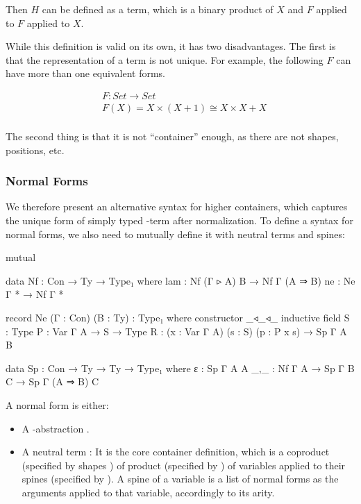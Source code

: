 Then $H$ can be defined as a term, which is a binary product of $X$ and $F$ applied to $F$ applied to $X$. \hyperref[Htm]{\faCog}

While this definition is valid on its own, it has two disadvantages. The first is that the representation of a term is not unique. For example, the following $F$ can have more than one equivalent forms.

\begin{align*}
& F : Set \to Set \\
& F (X) = X \times (X + 1) \cong X \times X + X \\
\end{align*}

The second thing is that it is not ``container'' enough, as there are not shapes, positions, etc.

\subsubsection*{Normal Forms}

We therefore present an alternative syntax for higher containers, which captures the unique form of simply typed \lambda-term after normalization. To define a syntax for normal forms, we also need to mutually define it with neutral terms and spines:

\begin{code}[hide]
mutual
\end{code}

\begin{code}
  data Nf : Con → Ty → Type₁ where
    lam : Nf (Γ ▹ A) B → Nf Γ (A ⇒ B)
    ne  : Ne Γ * → Nf Γ *

  record Ne (Γ : Con) (B : Ty) : Type₁ where
    constructor _◃_◃_
    inductive
    field
      S : Type
      P : Var Γ A → S → Type
      R : (x : Var Γ A) (s : S) (p : P x s) → Sp Γ A B

  data Sp : Con → Ty → Ty → Type₁ where
    ε   : Sp Γ A A
    _,_ : Nf Γ A → Sp Γ B C → Sp Γ (A ⇒ B) C
\end{code}

A normal form is either:

\begin{itemize}
  \item{A \lambda-abstraction .}
  \item{A neutral term : It is the core container definition, which is a coproduct (specified by shapes ) of product (specified by ) of variables applied to their spines (specified by ). A spine of a variable is a list of normal forms as the arguments applied to that variable, accordingly to its arity.}
\end{itemize}

